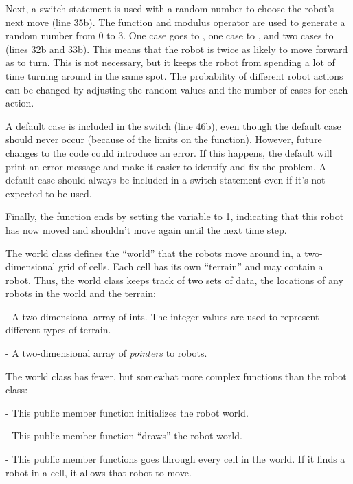 Next, a switch statement is used with a random number to choose the robot's next move (line 35b).  The  function and modulus operator are used to generate a random number from 0 to 3.  One case goes to , one case to , and two cases to  (lines 32b and 33b).  This means that the robot is twice as likely to move forward as to turn.  This is not necessary, but it keeps the robot from spending a lot of time turning around in the same spot.  The probability of different robot actions can be changed by adjusting the random values and the number of cases for each action.

A default case is included in the switch (line 46b), even though the default case should never occur (because of the limits on the  function).  However, future changes to the code could introduce an error.  If this happens, the default will print an error message and make it easier to identify and fix the problem.  A default case should always be included in a switch statement even if it's not expected to be used.  

Finally, the  function ends by setting the  variable to 1, indicating that this robot has now moved and shouldn't move again until the next time step.



The world class defines the ``world'' that the robots move around in, a two-dimensional grid of cells.
   Each cell has its own ``terrain'' and may contain a robot.  Thus, the world class keeps track of two sets of data, the locations of any robots in the world and the terrain:
\begin{tight_enumerate}
\item {} - A two-dimensional array of ints.  The integer values are used to represent different types of terrain. 
\item {} - A two-dimensional array of \emph{pointers} to robots. 
\end{tight_enumerate}
The world class has fewer, but somewhat more complex functions than the robot class:
\begin{tight_enumerate}
\item {} - This public member function initializes the robot world.
\item {} - This public member function ``draws'' the robot world.  
\item {} - This public member functions goes through every cell in the world.  If it finds a robot in a cell, it allows that robot to move.
\end{tight_enumerate}


